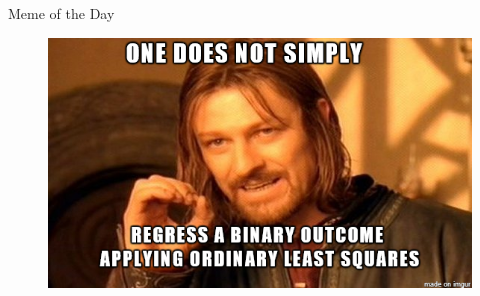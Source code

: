 \begin{frame}{Meme of the Day}{}
	\begin{figure}
		\includegraphics[scale=0.45]{07_logistic_regression/02_img/meme_of_the_day}
	\end{figure}
\end{frame}


\makethanks

